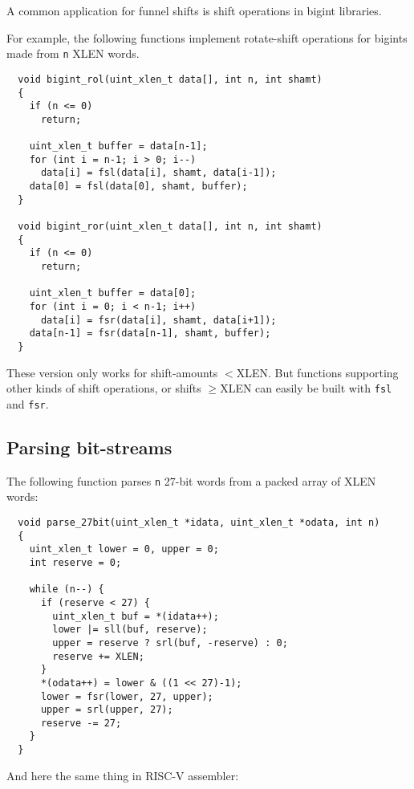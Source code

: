 A common application for funnel shifts is shift operations in bigint libraries.

For example, the following functions implement rotate-shift operations
for bigints made from {\tt n} XLEN words.

\begin{minipage}{\linewidth}
\begin{verbatim}
  void bigint_rol(uint_xlen_t data[], int n, int shamt)
  {
    if (n <= 0)
      return;

    uint_xlen_t buffer = data[n-1];
    for (int i = n-1; i > 0; i--)
      data[i] = fsl(data[i], shamt, data[i-1]);
    data[0] = fsl(data[0], shamt, buffer);
  }

  void bigint_ror(uint_xlen_t data[], int n, int shamt)
  {
    if (n <= 0)
      return;

    uint_xlen_t buffer = data[0];
    for (int i = 0; i < n-1; i++)
      data[i] = fsr(data[i], shamt, data[i+1]);
    data[n-1] = fsr(data[n-1], shamt, buffer);
  }
\end{verbatim}
\end{minipage}

These version only works for shift-amounts $<$XLEN. But functions supporting
other kinds of shift operations, or shifts $\ge$XLEN can easily be built
with {\tt fsl} and {\tt fsr}.

\subsection{Parsing bit-streams}

The following function parses {\tt n} 27-bit words from a packed array of XLEN words:

\begin{minipage}{\linewidth}
\begin{verbatim}
  void parse_27bit(uint_xlen_t *idata, uint_xlen_t *odata, int n)
  {
    uint_xlen_t lower = 0, upper = 0;
    int reserve = 0;

    while (n--) {
      if (reserve < 27) {
        uint_xlen_t buf = *(idata++);
        lower |= sll(buf, reserve);
        upper = reserve ? srl(buf, -reserve) : 0;
        reserve += XLEN;
      }
      *(odata++) = lower & ((1 << 27)-1);
      lower = fsr(lower, 27, upper);
      upper = srl(upper, 27);
      reserve -= 27;
    }
  }
\end{verbatim}
\end{minipage}

And here the same thing in RISC-V assembler:

